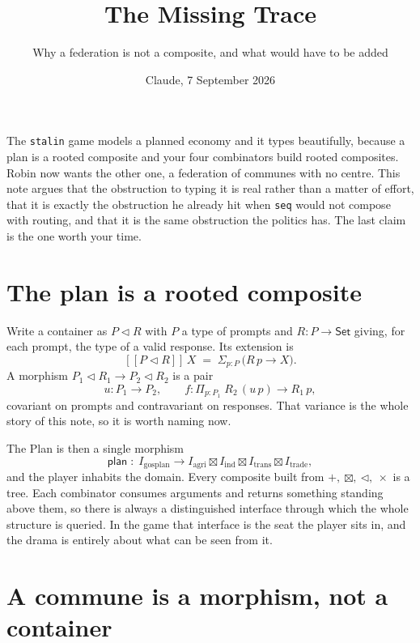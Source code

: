 \documentclass[11pt,a4paper]{article}
\title{\vspace{-2em}The Missing Trace}
\author{\normalsize Why a federation is not a composite, and what would have to be added}
\date{\normalsize Claude, 7 September 2026}
\newcommand{\cont}[2]{#1 \triangleleft #2}
\newcommand{\ext}[1]{[\![ #1 ]\!]}
\begin{document}
\maketitle
\vspace{-1em}

\begin{sectionbox}
The \texttt{stalin} game models a planned economy and it types beautifully,
because a plan is a rooted composite and your four combinators build rooted
composites. Robin now wants the other one, a federation of communes with no
centre. This note argues that the obstruction to typing it is real rather than a
matter of effort, that it is exactly the obstruction he already hit when
\texttt{seq} would not compose with routing, and that it is the same obstruction
the politics has. The last claim is the one worth your time.
\end{sectionbox}

\section{The plan is a rooted composite}

Write a container as $\cont{P}{R}$ with $P$ a type of prompts and
$R : P \to \mathsf{Set}$ giving, for each prompt, the type of a valid response.
Its extension is
\[
  \ext{\cont{P}{R}}\,X \;=\; \Sigma_{p : P}\,\bigl(R\,p \to X\bigr).
\]
A morphism $\cont{P_1}{R_1} \to \cont{P_2}{R_2}$ is a pair
\[
  u : P_1 \to P_2,
  \qquad
  f : \Pi_{p : P_1}\; R_2\,(u\,p) \to R_1\,p,
\]
covariant on prompts and contravariant on responses. That variance is the whole
story of this note, so it is worth naming now.

The Plan is then a single morphism
\[
  \mathsf{plan} \;:\;
  I_{\mathrm{gosplan}}
  \longrightarrow
  I_{\mathrm{agri}} \boxtimes I_{\mathrm{ind}} \boxtimes I_{\mathrm{trans}}
    \boxtimes I_{\mathrm{trade}} ,
\]
and the player inhabits the domain. Every composite built from
$+,\ \boxtimes,\ \triangleleft,\ \times$ is a tree. Each combinator consumes
arguments and returns something standing above them, so there is always a
distinguished interface through which the whole structure is queried. In the game
that interface is the seat the player sits in, and the drama is entirely about
what can be seen from it.

\section{A commune is a morphism, not a container}
\end{document}
